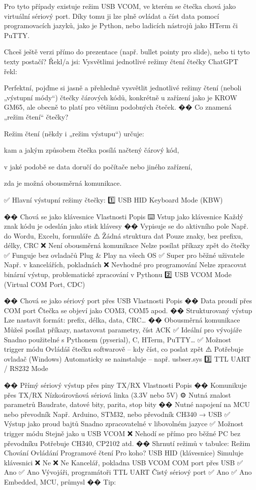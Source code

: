     Pro tyto případy existuje režim USB VCOM, ve kterém se čtečka chová jako virtuální sériový port. Díky tomu ji lze plně ovládat a číst data pomocí programovacích jazyků, jako je Python, nebo ladicích nástrojů jako HTerm či PuTTY.

Chceš ještě verzi přímo do prezentace (např. bullet pointy pro slide), nebo ti tyto texty postačí?
Řekl/a jsi:
Vysvětlimi jednotlivé režimy čtení čtečky
ChatGPT řekl:

Perfektní, pojďme si jasně a přehledně vysvětlit jednotlivé režimy čtení (neboli „výstupní módy“) čtečky čárových kódů, konkrétně u zařízení jako je KROW GM65, ale obecně to platí pro většinu podobných čteček.
�� Co znamená „režim čtení“ čtečky?

Režim čtení (někdy i „režim výstupu“) určuje:

    kam a jakým způsobem čtečka posílá načtený čárový kód,

    v jaké podobě se data doručí do počítače nebo jiného zařízení,

    zda je možná obousměrná komunikace.

✅ Hlavní výstupní režimy čtečky:
1️⃣ USB HID Keyboard Mode (KBW)

�� Chová se jako klávesnice
Vlastnosti	Popis
⌨️ Vstup jako klávesnice	Každý znak kódu je odeslán jako stisk klávesy
�� Vypisuje se do aktivního pole	Např. do Wordu, Excelu, formuláře
⚠️ Žádná struktura dat	Pouze znaky, bez prefixu, délky, CRC
❌ Není obousměrná komunikace	Nelze posílat příkazy zpět do čtečky
✅ Funguje bez ovladačů	Plug & Play na všech OS
✅ Super pro běžné uživatele	Např. v kancelářích, pokladnách
❌ Nevhodné pro programování	Nelze zpracovat binární výstup, problematické zpracování v Pythonu
2️⃣ USB VCOM Mode (Virtual COM Port, CDC)

�� Chová se jako sériový port přes USB
Vlastnosti	Popis
�� Data proudí přes COM port	Čtečka se objeví jako COM3, COM5 apod.
�� Strukturovaný výstup	Lze nastavit formát: prefix, délka, data, CRC…
�� Obousměrná komunikace	Můžeš posílat příkazy, nastavovat parametry, číst ACK
✅ Ideální pro vývojáře	Snadno použitelné s Pythonem (pyserial), C, HTerm, PuTTY…
✅ Možnost trigger módu	Ovládáš čtečku softwarově – kdy číst, co poslat zpět
⚠️ Potřebuje ovladač (Windows)	Automaticky se nainstaluje – např. usbser.sys
3️⃣ TTL UART / RS232 Mode

�� Přímý sériový výstup přes piny TX/RX
Vlastnosti	Popis
�� Komunikuje přes TX/RX	Nízkoúrovňová sériová linka (3.3V nebo 5V)
⚙️ Nutná znalost parametrů	Baudrate, datové bity, parita, stop bity
�� Nutné napojení na MCU nebo převodník	Např. Arduino, STM32, nebo převodník CH340 → USB
✅ Výstup jako proud bajtů	Snadno zpracovatelné v libovolném jazyce
✅ Možnost trigger módu	Stejně jako u USB VCOM
❌ Nehodí se přímo pro běžné PC bez převodníku	Potřebuje CH340, CP2102 atd.
�� Shrnutí režimů v tabulce:
Režim	Chování	Ovládání	Programové čtení	Pro koho?
USB HID (klávesnice)	Simuluje klávesnici	❌ Ne	❌ Ne	Kancelář, pokladna
USB VCOM	COM port přes USB	✅ Ano	✅ Ano	Vývojáři, programátoři
TTL UART	Čistý sériový port	✅ Ano	✅ Ano	Embedded, MCU, průmysl
�� Tip:

